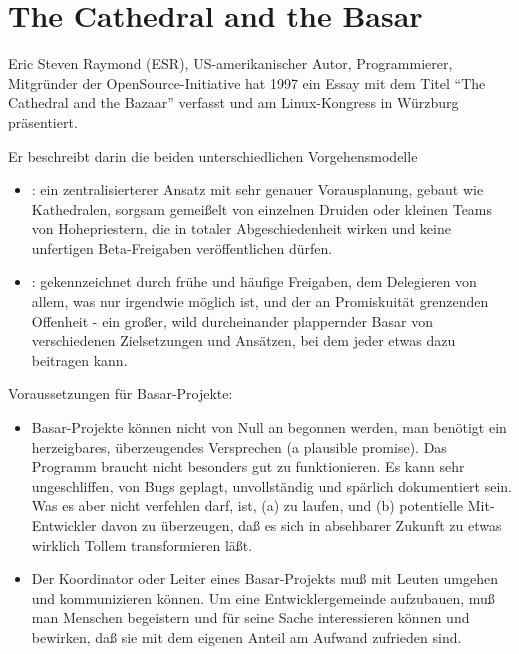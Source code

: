 \begin{minipage}[t]{0.5\linewidth}
\section{The Cathedral and the Basar}
Eric Steven Raymond (ESR), US-amerikanischer Autor, Programmierer,
Mitgründer der OpenSource-Initiative hat 1997 ein Essay mit dem Titel
``The Cathedral and the Bazaar'' verfasst und am Linux-Kongress in
Würzburg präsentiert.

Er beschreibt darin die beiden unterschiedlichen Vorgehensmodelle
\begin{itemize}
\item {}: ein zentralisierterer Ansatz mit sehr genauer
  Vorausplanung, gebaut wie Kathedralen, sorgsam gemeißelt von
  einzelnen Druiden oder kleinen Teams von Hohepriestern, die in
  totaler Abgeschiedenheit wirken und keine unfertigen Beta-Freigaben
  veröffentlichen dürfen.
\item {}: gekennzeichnet durch frühe und häufige Freigaben, dem
  Delegieren von allem, was nur irgendwie möglich ist, und der an
  Promiskuität grenzenden Offenheit - ein großer, wild durcheinander
  plappernder Basar von verschiedenen Zielsetzungen und Ansätzen,
  bei dem jeder etwas dazu beitragen kann.
\end{itemize}
\newslide
Voraussetzungen für Basar-Projekte:
\begin{itemize}
\item Basar-Projekte können nicht von Null an begonnen werden, man
benötigt ein herzeigbares, überzeugendes Versprechen (a plausible
promise).
Das Programm
braucht nicht besonders gut zu funktionieren. Es kann sehr
ungeschliffen, von Bugs geplagt, unvollständig und spärlich
dokumentiert sein. Was es aber nicht verfehlen darf, ist, (a) zu
laufen, und (b) potentielle Mit-Entwickler davon zu überzeugen, daß es
sich in absehbarer Zukunft zu etwas wirklich Tollem transformieren
läßt.
\item Der Koordinator oder Leiter eines Basar-Projekts muß mit Leuten
  umgehen und kommunizieren können. Um eine Entwicklergemeinde
  aufzubauen, muß man Menschen begeistern und für seine Sache
  interessieren können und bewirken, daß sie mit dem eigenen Anteil am
  Aufwand zufrieden sind.
\end{itemize}
%
\newpage

\end{minipage}
